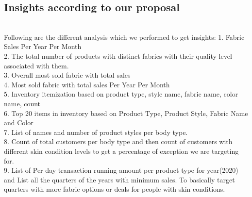 \documentclass[11pt,journal,compsoc]{IEEEtran}
\begin{document}
\subsection{Insights according to our proposal} \\
Following are the different analysis which we performed to get insights: 
1. Fabric Sales Per Year Per Month\\
2. The total number of products with distinct fabrics with their quality level associated with them.\\
3. Overall most sold fabric with total sales\\
4. Most sold fabric with total sales Per Year Per Month\\
5. Inventory itemization based on product type, style name, fabric name, color name, count\\
6. Top 20 items in inventory based on Product Type, Product Style, Fabric Name and Color\\
7. List of names and number of product styles per body type.\\
8. Count of total customers per body type and then count of customers with different skin condition levels to get a percentage of exception we are targeting for.\\
9. List of Per day transaction running amount per product type for year(2020) and  List all the quarters of the years with minimum sales. To basically target quarters with more fabric options or deals for people with skin conditions.\\
\end{document}
